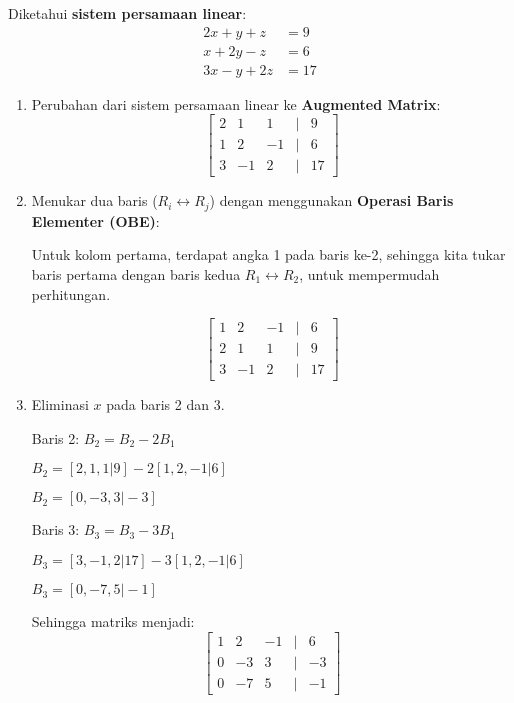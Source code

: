 \documentclass{article}
\begin{document}
\pagestyle{empty}

Diketahui \textbf{sistem persamaan linear}:
\begin{align*}
2x + y + z &= 9 \\
x + 2y - z &= 6 \\
3x - y + 2z &= 17
\end{align*}

\begin{enumerate}
    \item Perubahan dari sistem persamaan linear ke \textbf{Augmented Matrix}:
    \[
    \begin{bmatrix}
    2 & 1 & 1 & \vert & 9 \\
    1 & 2 & -1 & \vert & 6 \\
    3 & -1 & 2 & \vert & 17
    \end{bmatrix}
    \]
    \item Menukar dua baris (\(R_i \leftrightarrow R_j\)) dengan menggunakan \textbf{Operasi Baris Elementer (OBE)}:
    
    Untuk kolom pertama, terdapat angka 1 pada baris ke-2, sehingga kita tukar baris pertama dengan baris kedua \(R_1 \leftrightarrow R_2\), untuk mempermudah perhitungan.

    \[
    \begin{bmatrix}
    1 & 2 & -1 & \vert & 6 \\
    2 & 1 & 1 & \vert & 9 \\
    3 & -1 & 2 & \vert & 17
    \end{bmatrix}
    \]

    \item Eliminasi $x$ pada baris 2 dan 3.

    Baris 2: \(B_2 = B_2 - 2B_1\)

    \(B_2 = [2, 1, 1 \vert 9] - 2[1, 2, -1 \vert 6]\)

    \(B_2 = [0, -3, 3 \vert -3]\)

    Baris 3: \(B_3 = B_3 - 3B_1\)

    \(B_3 = [3, -1, 2 \vert 17] - 3[1, 2, -1 \vert 6]\)

    \(B_3 = [0, -7, 5 \vert -1]\)

    \vspace{1em}

    Sehingga matriks menjadi:
    \[
    \begin{bmatrix}
    1 & 2 & -1 & \vert & 6 \\
    0 & -3 & 3 & \vert & -3 \\
    0 & -7 & 5 & \vert & -1
    \end{bmatrix}
    \]


\end{enumerate}
\end{document}
